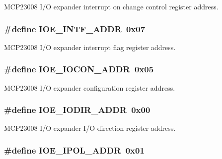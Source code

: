 M\-C\-P23008 I/\-O expander interrupt on change control register address. \hypertarget{a00007_a32cac2ad5af58a2562540ec8fc205dd1}{
\subsubsection[{I\-O\-E\-\_\-\-I\-N\-T\-F\-\_\-\-A\-D\-D\-R}]{\setlength{\rightskip}{0pt plus 5cm}\#define I\-O\-E\-\_\-\-I\-N\-T\-F\-\_\-\-A\-D\-D\-R~0x07}}\label{a00007_a32cac2ad5af58a2562540ec8fc205dd1}
M\-C\-P23008 I/\-O expander interrupt flag register address. \hypertarget{a00007_af44ed2bf93808aeb932ce9944a942b75}{
\subsubsection[{I\-O\-E\-\_\-\-I\-O\-C\-O\-N\-\_\-\-A\-D\-D\-R}]{\setlength{\rightskip}{0pt plus 5cm}\#define I\-O\-E\-\_\-\-I\-O\-C\-O\-N\-\_\-\-A\-D\-D\-R~0x05}}\label{a00007_af44ed2bf93808aeb932ce9944a942b75}
M\-C\-P23008 I/\-O expander configuration register address. \hypertarget{a00007_a36c134b088cc2e64e0a5e14e8f90fe38}{
\subsubsection[{I\-O\-E\-\_\-\-I\-O\-D\-I\-R\-\_\-\-A\-D\-D\-R}]{\setlength{\rightskip}{0pt plus 5cm}\#define I\-O\-E\-\_\-\-I\-O\-D\-I\-R\-\_\-\-A\-D\-D\-R~0x00}}\label{a00007_a36c134b088cc2e64e0a5e14e8f90fe38}
M\-C\-P23008 I/\-O expander I/\-O direction register address. \hypertarget{a00007_a04633cd2ea7fd0b332e1edf066f674c4}{
\subsubsection[{I\-O\-E\-\_\-\-I\-P\-O\-L\-\_\-\-A\-D\-D\-R}]{\setlength{\rightskip}{0pt plus 5cm}\#define I\-O\-E\-\_\-\-I\-P\-O\-L\-\_\-\-A\-D\-D\-R~0x01}}\label{a00007_a04633cd2ea7fd0b332e1edf066f674c4}

